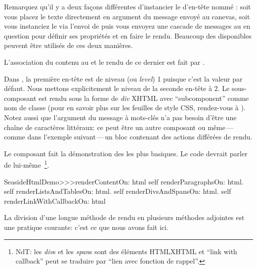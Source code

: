 \documentclass[a4paper,10pt,twoside]{book}
\begin{document}
Remarquez qu'il y a deux façons différentes d'instancier le \brush
d'en-tête nommé :
soit vous placez le texte directement en argument du message
envoyé au canevas,
soit vous instanciez le \brush via l'envoi de  puis 
vous envoyez une cascade de messages au \brush{} en question pour
définir ses propriétés et en faire le rendu.
Beaucoup des \brushes disponibles peuvent être utilisés de ces deux
manières.

L'association du contenu au \brush{} et le rendu de ce dernier est
fait par .

Dans , la première en-tête est de niveau
(ou \emph{level}) 1 puisque c'est la valeur par défaut.
Nous mettons explicitement le niveau de la seconde en-tête à 2.
Le sous-composant est rendu sous la forme de \emph{div} XHTML avec
``subcomponent'' comme nom de classe  (pour en savoir plus
sur les feuilles de style CSS, rendez-vous à ).
Notez aussi que l'argument du message à mots-clés  n'a pas
besoin d'être une chaîne de caractères littéraux: ce peut être un autre
composant ou même\,---\,comme dans l'exemple suivant\,---\,un
bloc contenant des actions différées de rendu.

Le composant  fait la démonstration des \brushes{}
les plus basiques.
Le code devrait parler de lui-même~\footnote{NdT: les \emph{div}{s} et
  les \emph{span}{s} sont des éléments HTML\/XHTML et ``link with
  callback'' peut se traduire par ``lien avec fonction de rappel''.}.


\begin{code}{}
SeasideHtmlDemo>>>renderContentOn: html 
	self renderParagraphsOn: html.
	self renderListsAndTablesOn: html.
	self renderDivsAndSpansOn: html.
	self renderLinkWithCallbackOn: html
\end{code}

La division d'une longue méthode de rendu en plusieurs méthodes adjointes
est une pratique courante: c'est ce que nous avons fait ici.
\end{document}
